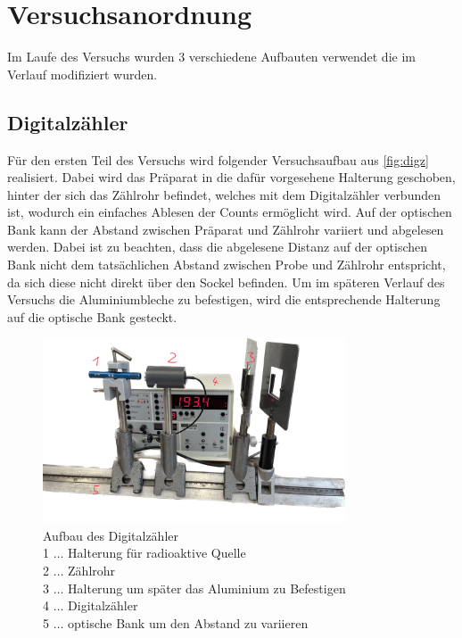 \documentclass[12pt,english,ngerman]{scrartcl}
\begin{document}
\section{Versuchsanordnung}\label{sec:Versuchsanordnung}

Im Laufe des Versuchs wurden 3 verschiedene Aufbauten verwendet die im Verlauf modifiziert wurden.

\subsection{Digitalzähler}\label{aufbau_Digz}

Für den ersten Teil des Versuchs wird folgender Versuchsaufbau aus
\autoref{fig:digz} realisiert. Dabei wird das Präparat in die dafür vorgesehene
Halterung geschoben, hinter der sich das Zählrohr befindet, welches mit dem
Digitalzähler verbunden ist, wodurch ein einfaches Ablesen der Counts
ermöglicht wird. Auf der optischen Bank kann der Abstand zwischen Präparat und
Zählrohr variiert und abgelesen werden. Dabei ist zu beachten, dass die
abgelesene Distanz auf der optischen Bank nicht dem tatsächlichen Abstand
zwischen Probe und Zählrohr entspricht, da sich diese nicht direkt über den
Sockel befinden. Um im späteren Verlauf des Versuchs die Aluminiumbleche zu
befestigen, wird die entsprechende Halterung auf die optische Bank gesteckt.

\begin{figure}[H]
  \begin{center}
  \includegraphics[width = 0.8\textwidth]{./figures/digz.png}
	
\end{center}
	\caption[Aufbau des Digitalzähler]{Aufbau des Digitalzähler \\
    1 \(\dots\) Halterung für radioaktive Quelle \\
    2 \(\dots\) Zählrohr \\
    3 \(\dots\) Halterung um später das Aluminium zu Befestigen \\
    4 \(\dots\) Digitalzähler \\
    5 \(\dots\) optische Bank um den Abstand zu variieren}
	\label{fig:digz}

\end{figure}
\end{document}

